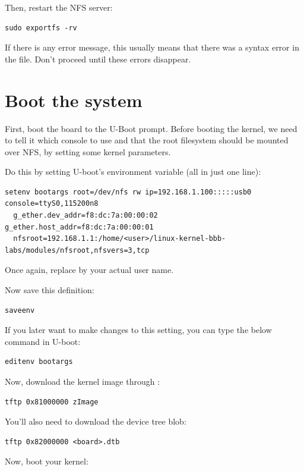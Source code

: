 Then, restart the NFS server:

\begin{verbatim}
sudo exportfs -rv
\end{verbatim}

If there is any error message, this usually means that there was a
syntax error in the  file. Don't proceed until these
errors disappear.

\section{Boot the system}

First, boot the board to the U-Boot prompt. Before booting the kernel,
we need to tell it which console to use and that the root filesystem
should be mounted over NFS, by setting some kernel parameters.

Do this by setting U-boot's  environment variable (all in
just one line):

\begin{verbatim}
setenv bootargs root=/dev/nfs rw ip=192.168.1.100:::::usb0 console=ttyS0,115200n8
  g_ether.dev_addr=f8:dc:7a:00:00:02 g_ether.host_addr=f8:dc:7a:00:00:01
  nfsroot=192.168.1.1:/home/<user>/linux-kernel-bbb-labs/modules/nfsroot,nfsvers=3,tcp
\end{verbatim}

Once again, replace  by your actual user name.

Now save this definition:
\begin{verbatim}
saveenv
\end{verbatim}

If you later want to make changes to this setting, you can type the
below command in U-boot:

\begin{verbatim}
editenv bootargs
\end{verbatim}

Now, download the kernel image through :

\begin{verbatim}
tftp 0x81000000 zImage
\end{verbatim}

You'll also need to download the device tree blob:

\begin{verbatim}
tftp 0x82000000 <board>.dtb
\end{verbatim}

Now, boot your kernel:

